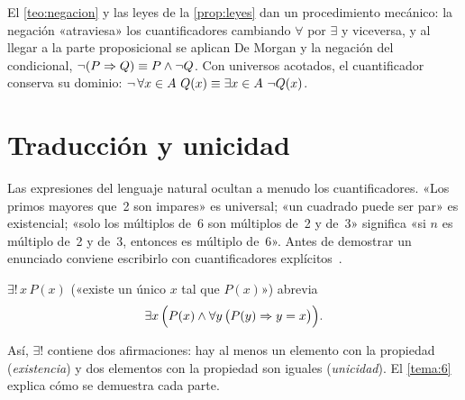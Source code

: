 El \cref{teo:negacion} y las leyes de la \cref{prop:leyes} dan un procedimiento mecánico: la negación «atraviesa» los cuantificadores cambiando $\forall$ por $\exists$ y viceversa, y al llegar a la parte proposicional se aplican De Morgan y la negación del condicional, $\neg(P\Rightarrow Q)\equiv P\wedge\neg Q$. Con universos acotados, el cuantificador conserva su dominio: $\neg\,\forall x\in A\ Q(x)\eqlog\exists x\in A\ \neg Q(x)$.

\addtocounter{definicion}{1}%

\section{Traducción y unicidad}

Las expresiones del lenguaje natural ocultan a menudo los cuantificadores. «Los primos mayores que~2 son impares» es universal; «un cuadrado puede ser par» es existencial; «solo los múltiplos de~6 son múltiplos de~2 y de~3» significa «si $n$ es múltiplo de~2 y de~3, entonces es múltiplo de~6». Antes de demostrar un enunciado conviene escribirlo con cuantificadores explícitos~\cite[§2.9]{hammack}.

\begin{definicion}\label{def:unicidad}
$\exists!\,x\,P(x)$ («existe un único $x$ tal que $P(x)$») abrevia
\[
\exists x\,\Bigl(P(x)\wedge\forall y\,\bigl(P(y)\Rightarrow y=x\bigr)\Bigr).
\]
\end{definicion}

Así, $\exists!$ contiene dos afirmaciones: hay al menos un elemento con la propiedad (\emph{existencia}) y dos elementos con la propiedad son iguales (\emph{unicidad}). El \cref{tema:6} explica cómo se demuestra cada parte.

\addtocounter{definicion}{1}%

\addtocounter{definicion}{1}%

